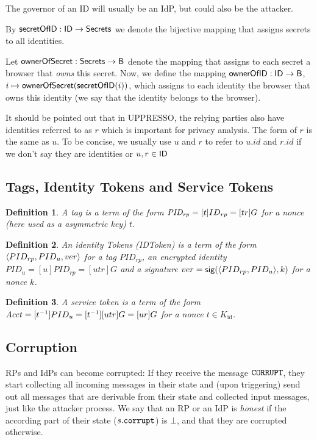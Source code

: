 \documentclass[letterpaper,onecolumn,10pt]{article}
\newtheorem{definition}{Definition}
\begin{document}
The governor of an ID will usually be an IdP, but could also be the
attacker. 

By $\mathsf{secretOfID}:\mathsf{ID} \to \mathsf{Secrets}$ we denote the bijective mapping
that assigns secrets to all identities. 

Let $\mathsf{ownerOfSecret}: \mathsf{Secrets} \to \mathsf{B}$ denote the mapping that
assigns to each secret a browser that \emph{owns} this secret. Now, we
define the mapping $\mathsf{ownerOfID}: \mathsf{ID} \to \mathsf{B}$, $i \mapsto
\mathsf{ownerOfSecret}(\mathsf{secretOfID}(i))$, which assigns to each identity the
browser that owns this identity (we say that the identity belongs to
the browser).

It should be pointed out that in UPPRESSO, the relying parties also have 
identities referred to as $r$ which is important for privacy analysis. 
The form of $r$ is the same as $u$. To be concise, we usually use $u$ and $r$ to
refer to $u.id$ and $r.id$ if we don't say they are identities or $u,r\in\mathsf{ID}$

\subsection{Tags, Identity Tokens and Service Tokens}\label{app:identity-assertions}

\begin{definition}\label{def:tag}
  A \emph{tag} is a term of the form $\mathit{PID_{rp}}=[t]ID_{rp}=[tr]G$ for a nonce 
  (here used as a asymmetric key) $t$.
\end{definition}
\begin{definition}
  An \emph{identity Tokens (IDToken)} is a term of the form 
  $\langle PID_{rp}, PID_u, ver\rangle$ for a tag $PID_{rp}$, an encrypted identity 
  $PID_u=[u]PID_{rp}=[utr]G$ and a signature $ver=\mathsf{sig}({\langle PID_{rp},PID_u\rangle},{k})$ 
  for a nonce $k$.
\end{definition}
\begin{definition}
  A \emph{service token} is a term of the form $\mathit{Acct} = [t^{-1}]PID_u=[t^{-1}][utr]G=[ur]G$ 
  for a nonce $t\in K_\text{id}$.
\end{definition}

\subsection{Corruption}
RPs and IdPs can become corrupted: If they receive the message
$\mathtt{CORRUPT}$, they start collecting all incoming messages in their state
and (upon triggering) send out all messages that are derivable from
their state and collected input messages, just like the attacker
process. We say that an RP or an IdP is \emph{honest} if the according
part of their state ($s.\mathtt{corrupt}$) is $\bot$, and that they are
corrupted otherwise.
\end{document}
